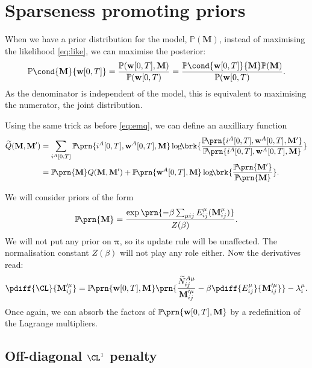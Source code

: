 \documentclass[12pt]{article}
\newcommand{\pib}{\boldsymbol{\pi}}
\newcommand{\w}{\mathbf{w}}
\newcommand{\M}{\mathbf{M}}
\newcommand{\pr}{\mathbb{P}}
\begin{document}
\section{Sparseness promoting priors \label{sec:priors}}

When we have a prior distribution for the model, $\pr(\M)$, instead of maximising the likelihood \eqref{eq:like}, we can maximise the posterior:
%
\begin{equation}\label{eq:posterior}
  \pr\cond{\M}{\w[0,T]} = \frac{ \pr(\w[0,T],\M) }{ \pr(\w[0,T) } = \frac{ \pr\cond{\w[0,T]}{\M} \pr(\M) }{ \pr(\w[0,T) }.
\end{equation}
%
As the denominator is independent of the model, this is equivalent to maximising the numerator, \ie the joint distribution.

Using the same trick as before \eqref{eq:emq}, we can define an auxilliary function
%
\begin{equation}\label{eq:emqprior}
\begin{aligned}
  \widetilde{Q}(\M,\M') &= \sum_{i^A[0,T]} \pr\!\prn{i^A[0,T],\w^A[0,T],\M} \log\!\! \brk{
      \frac{ \pr\!\prn{i^A[0,T],\w^A[0,T],\M'} }{ \pr\!\prn{i^A[0,T],\w^A[0,T],\M} } }\\
      &= \pr\!\prn{\M} Q(\M,\M') + \pr\!\prn{\w^A[0,T],\M} \log\!\! \brk{
      \frac{ \pr\!\prn{\M'} }{ \pr\!\prn{\M} } }.
\end{aligned}
\end{equation}
%

We will consider priors of the form
%
\begin{equation}\label{eq:priorsum}
  \pr\!\prn{\M} = \frac{\exp\prn{-\beta\sum_{\mu ij}E^\mu_{ij}(\M^\mu_{ij})}}{Z(\beta)}.
\end{equation}
%
We will not put any prior on $\pib$, so its update rule will be unaffected.
The normalisation constant $Z(\beta)$ will not play any role either.
Now the derivatives read:
%
\begin{equation}\label{eq:priordiffs}
  \pdiff{\CL}{\M'^\mu_{ij}} 
    = \pr\!\prn{\w[0,T],\M} \prn{ \frac{ \widetilde{N}^{A\mu}_{ij} }{ \M'^\mu_{ij} }  - \beta \pdiff{E^\mu_{ij}}{\M'^\mu_{ij}} }- \lambda^\mu_{i}.
\end{equation}
%
Once again, we can absorb the factors of $\pr\!\prn{\w[0,T],\M}$ by a redefinition of the Lagrange multipliers.


\subsection{Off-diagonal \texorpdfstring{$\CL^1$}{L\textasciicircum1} penalty \label{sec:offdiagL1}}
\end{document}

